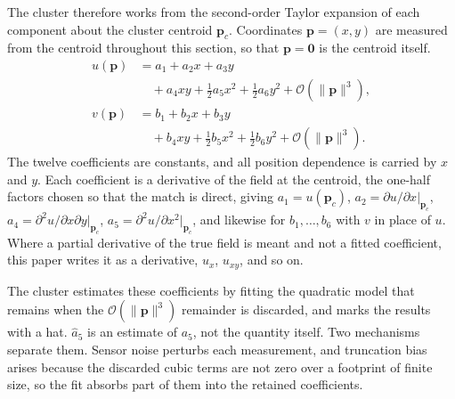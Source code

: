 \documentclass[lettersize,journal]{IEEEtran}
\begin{document}
The cluster therefore works from the second-order Taylor expansion of
each component about the cluster centroid $\mathbf{p}_c$. Coordinates
$\mathbf{p} = (x, y)$ are measured from the centroid throughout this
section, so that $\mathbf{p} = \mathbf{0}$ is the centroid itself.
\begin{align}
    u(\mathbf{p}) &= a_1 + a_2 x + a_3 y
        \nonumber \\
        &\quad + a_4 xy + \tfrac{1}{2} a_5 x^2 + \tfrac{1}{2} a_6 y^2
        + \mathcal{O}(\|\mathbf{p}\|^3),
        \label{eq:quad_model_u} \\
    v(\mathbf{p}) &= b_1 + b_2 x + b_3 y
        \nonumber \\
        &\quad + b_4 xy + \tfrac{1}{2} b_5 x^2 + \tfrac{1}{2} b_6 y^2
        + \mathcal{O}(\|\mathbf{p}\|^3).
        \label{eq:quad_model_v}
\end{align}
The twelve coefficients are constants, and all position dependence is
carried by $x$ and $y$. Each coefficient is a derivative of the field at
the centroid, the one-half factors chosen so that the match is direct,
giving $a_1 = u(\mathbf{p}_c)$, $a_2 = \partial u/\partial
x|_{\mathbf{p}_c}$, $a_4 = \partial^2 u/\partial x \partial
y|_{\mathbf{p}_c}$, $a_5 = \partial^2 u/\partial x^2|_{\mathbf{p}_c}$,
and likewise for $b_1, \ldots, b_6$ with $v$ in place of $u$. Where a
partial derivative of the true field is meant and not a fitted
coefficient, this paper writes it as a derivative, $u_x$, $u_{xy}$, and
so on.

The cluster estimates these coefficients by fitting the quadratic model
that remains when the $\mathcal{O}(\|\mathbf{p}\|^3)$ remainder is
discarded, and marks the results with a hat. $\hat{a}_5$ is an estimate
of $a_5$, not the quantity itself. Two mechanisms separate them. Sensor
noise perturbs each measurement, and truncation bias arises because the
discarded cubic terms are not zero over a footprint of finite size, so
the fit absorbs part of them into the retained coefficients.
\end{document}
